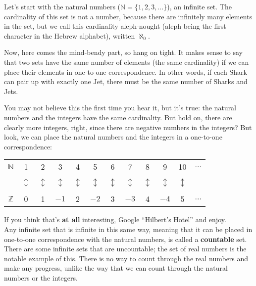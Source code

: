 Let's start with the natural numbers ($\mathbb{N} = \{1,2,3,\ldots\}$), an infinite set.  The cardinality of this set is not a number, because there are infinitely many elements in the set, but we call this cardinality aleph-nought (aleph being the first character in the Hebrew alphabet), written $\aleph_0$.

Now, here comes the mind-bendy part, so hang on tight.  It makes sense to say that two sets have the same number of elements (the same cardinality) if we can place their elements in one-to-one correspondence.  In other words, if each Shark can pair up with exactly one Jet, there must be the same number of Sharks and Jets.

You may not believe this the first time you hear it, but it's true: the natural numbers and the integers have the same cardinality.  But hold on, there are clearly more integers, right, since there are negative numbers in the integers?  But look, we can place the natural numbers and the integers in a one-to-one correspondence:
\begin{center}
\begin{tabular}{c | c c c c c c c c c c c}
$\mathbb{N}$ & 1 & 2 & 3 & 4 & 5 & 6 & 7 & 8 & 9 & 10 & $\ldots$\\
& & & & & & & & & & & \\
& $\updownarrow$ & $\updownarrow$ & $\updownarrow$ & $\updownarrow$ & $\updownarrow$ & $\updownarrow$ & $\updownarrow$ & $\updownarrow$ & $\updownarrow$ & $\updownarrow$ & \\
& & & & & & & & & & & \\
$\mathbb{Z}$ & 0 & 1 & $-1$ & 2 & $-2$ & 3 & $-3$ & 4 & $-4$ & 5 & $\ldots$
\end{tabular}
\end{center}

If you think that's \textbf{at all} interesting, Google ``Hilbert's Hotel'' and enjoy.\\

Any infinite set that is infinite in this same way, meaning that it can be placed in one-to-one correspondence with the natural numbers, is called a \textbf{countable} set.  There are some infinite sets that are uncountable; the set of real numbers is the notable example of this.  There is no way to count through the real numbers and make any progress, unlike the way that we can count through the natural numbers or the integers.\\
\vfill
\pagebreak

